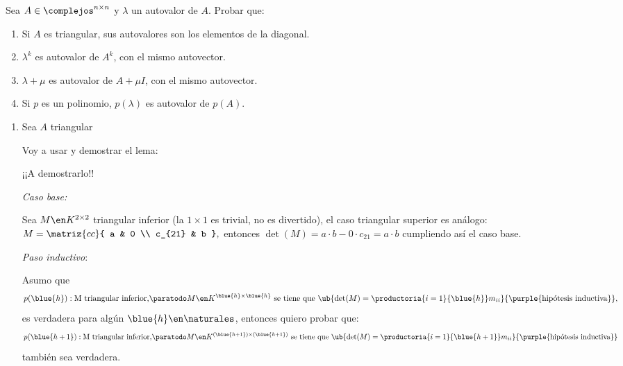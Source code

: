 \begin{enunciado}{\ejercicio}
  Sea $A \in \complejos^{n \times n}$ y $\lambda$ un autovalor de $A$. Probar que:
  \begin{enumerate}[label=(\alph*)]
    \item Si $A$ es triangular, sus autovalores son los elementos de la diagonal.
    \item $\lambda^k$ es autovalor de $A^k$, con el mismo autovector.
    \item $\lambda + \mu$ es autovalor de $A + \mu I$, con el mismo autovector.
    \item Si $p$ es un polinomio, $p(\lambda)$ es autovalor de $p(A)$.
  \end{enumerate}
\end{enunciado}

\begin{enumerate}[label=(\alph*)]
  \item
        Sea $A$ triangular

        Voy a usar y demostrar el lema:

        ¡¡A demostrarlo!!

        \textit{Caso base:}

        Sea $M \en K^{2 \times 2}$ triangular inferior {\tiny(la $1 \times 1$ es trivial, no es divertido)}, el caso triangular superior
        es análogo:
        $
          M =
          \matriz{cc}{
            a      & 0 \\
            c_{21} & b
          },
        $
        entonces $\det(M) = a \cdot b - 0 \cdot c_{21} = a \cdot b$ cumpliendo así el caso base.

        \bigskip

        \textit{Paso inductivo}:

        Asumo que
        $$
          p(\blue{h}) : \text{M triangular inferior,} \paratodo M \en K^{\blue{h} \times \blue{h}} \text{ se tiene que }
          \ub{\det(M) = \productoria{i=1}{\blue{h}} m_{ii}}{\text{\purple{hipótesis inductiva}}},
        $$
        es verdadera para algún $\blue{h} \en \naturales$, entonces quiero probar que:
        $$
          p(\blue{h+1}) : \text{M triangular inferior,}
          \paratodo M \en K^{(\blue{h+1}) \times (\blue{h+1})} \text{ se tiene que } \ub{\det(M) = \productoria{i=1}{\blue{h+1}} m_{ii}}{\text{\purple{hipótesis inductiva}}}
        $$
        también sea verdadera.


\end{enumerate}
